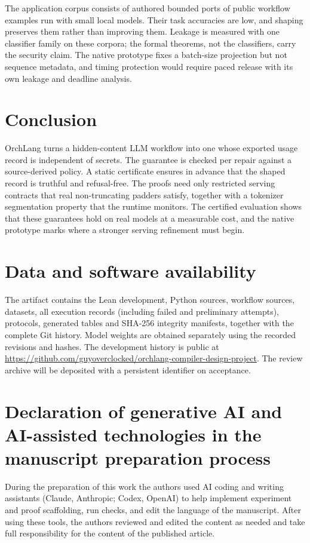 \documentclass[preprint,12pt]{elsarticle}
\theoremstyle{definition}
\begin{document}
The application corpus consists of authored bounded ports of public workflow
examples run with small local models. Their task accuracies are low, and shaping
preserves them rather than improving them. Leakage is measured with one classifier
family on these corpora; the formal theorems, not the classifiers, carry the
security claim. The native prototype fixes a batch-size projection but not
sequence metadata, and timing protection would require paced release with its own
leakage and deadline analysis.

\section{Conclusion}

OrchLang turns a hidden-content LLM workflow into one whose exported usage record
is independent of secrets. The guarantee is checked per repair against a
source-derived policy. A static certificate ensures in advance that the shaped
record is truthful and refusal-free. The proofs need only restricted serving
contracts that real non-truncating padders satisfy, together with a tokenizer
segmentation property that the runtime monitors. The certified evaluation shows
that these guarantees hold on real models at a measurable cost, and the native
prototype marks where a stronger serving refinement must begin.

\section*{Data and software availability}
The artifact contains the Lean development, Python sources, workflow sources,
datasets, all execution records (including failed and preliminary attempts),
protocols, generated tables and SHA-256 integrity manifests, together with the
complete Git history. Model weights are obtained separately using the recorded
revisions and hashes. The development history is public at
\url{https://github.com/guyoverclocked/orchlang-compiler-design-project}. The
review archive will be deposited with a persistent identifier on acceptance.

\section*{Declaration of generative AI and AI-assisted technologies in the manuscript preparation process}
During the preparation of this work the authors used AI coding and writing
assistants (Claude, Anthropic; Codex, OpenAI) to help implement experiment and
proof scaffolding, run checks, and edit the language of the manuscript. After
using these tools, the authors reviewed and edited the content as needed and take
full responsibility for the content of the published article.
\end{document}
